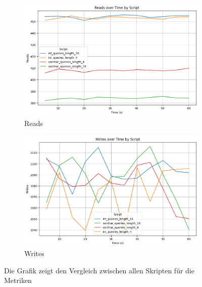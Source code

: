 \vspace{-5pt}
\begin{figure}[H]
    \centering
    \begin{subfigure}[t]{0.48\textwidth}
        \centering
        \includegraphics[width=\textwidth]{PNGs/Script/Join_Typ/join-type/Reads}
        \caption{Reads}
        \label{join-typ-reads}
    \end{subfigure}
    \hfill
    \begin{subfigure}[t]{0.48\textwidth}
        \centering
        \includegraphics[width=\textwidth]{PNGs/Script/Join_Typ/join-type/Writes}
        \caption{Writes}
        \label{join-typ-writes}
    \end{subfigure}
    \caption[Join-Typ: Metrikvergleich]{Die Grafik zeigt den Vergleich zwischen allen Skripten für die Metriken}
    \label{fig:join-typ-comp-metric}
\end{figure}
\vspace{-20pt}

